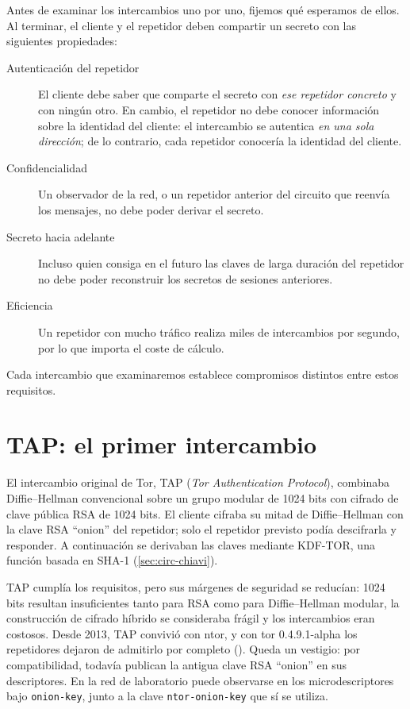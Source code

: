 Antes de examinar los intercambios uno por uno, fijemos qué esperamos de ellos. Al terminar, el cliente y el repetidor deben compartir un secreto con las siguientes propiedades:
\begin{description}
  \item[Autenticación del repetidor] El cliente debe saber que comparte el secreto con \emph{ese repetidor concreto} y con ningún otro. En cambio, el repetidor no debe conocer información sobre la identidad del cliente: el intercambio se autentica \emph{en una sola dirección}; de lo contrario, cada repetidor conocería la identidad del cliente.
  \item[Confidencialidad] Un observador de la red, o un repetidor anterior del circuito que reenvía los mensajes, no debe poder derivar el secreto.
  \item[Secreto hacia adelante] Incluso quien consiga en el futuro las claves de larga duración del repetidor no debe poder reconstruir los secretos de sesiones anteriores.
  \item[Eficiencia] Un repetidor con mucho tráfico realiza miles de intercambios por segundo, por lo que importa el coste de cálculo.
\end{description}
Cada intercambio que examinaremos establece compromisos distintos entre estos requisitos.

\section{TAP: el primer intercambio}\label{sec:tap}

El intercambio original de Tor, TAP (\emph{Tor Authentication Protocol}), combinaba Diffie--Hellman convencional sobre un grupo modular de 1024 bits con cifrado de clave pública RSA de 1024 bits. El cliente cifraba su mitad de Diffie--Hellman con la clave RSA \enquote{onion} del repetidor; solo el repetidor previsto podía descifrarla y responder. A continuación se derivaban las claves mediante KDF-TOR, una función basada en SHA-1 (\cref{sec:circ-chiavi}).

TAP cumplía los requisitos, pero sus márgenes de seguridad se reducían: 1024 bits resultan insuficientes tanto para RSA como para Diffie--Hellman modular, la construcción de cifrado híbrido se consideraba frágil y los intercambios eran costosos. Desde 2013, TAP convivió con ntor, y con tor 0.4.9.1-alpha los repetidores dejaron de admitirlo por completo (). Queda un vestigio: por compatibilidad, todavía publican la antigua clave RSA \enquote{onion} en sus descriptores. En la red de laboratorio puede observarse en los microdescriptores bajo \texttt{onion-key}, junto a la clave \texttt{ntor-onion-key} que sí se utiliza.

